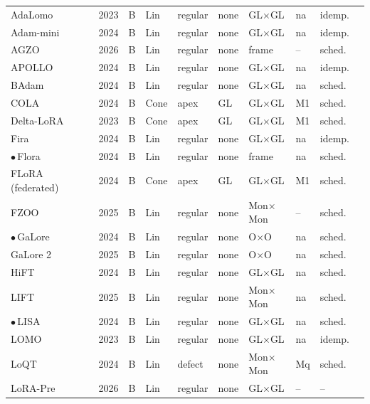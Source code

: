 \begin{longtable}{@{}>{\raggedright\arraybackslash}p{2.53cm}>{\raggedright\arraybackslash}p{3.2cm}r l l l l l l l l@{}}
AdaLomo & \citealp{lv2023adalomo} & 2023 & B & Lin & regular & none & GL$\times$GL & na & idemp. & \\
Adam-mini & \citealp{zhang2024adam} & 2024 & B & Lin & regular & none & GL$\times$GL & na & idemp. & \\
AGZO & \citealp{lin2026agzo} & 2026 & B & Lin & regular & none & frame & -- & sched. & \\
APOLLO & \citealp{zhu2024apollo} & 2024 & B & Lin & regular & none & GL$\times$GL & na & idemp. & \\
BAdam & \citealp{luo2024badam} & 2024 & B & Lin & regular & none & GL$\times$GL & na & sched. & \\
COLA & \citealp{xia2024chain} & 2024 & B & Cone & apex & GL & GL$\times$GL & M1 & sched. & \\
Delta-LoRA & \citealp{zi2023delta} & 2023 & B & Cone & apex & GL & GL$\times$GL & M1 & sched. & \\
Fira & \citealp{chen2024fira} & 2024 & B & Lin & regular & none & GL$\times$GL & na & idemp. & \\
$\bullet$\,Flora & \citealp{hao2024flora} & 2024 & B & Lin & regular & none & frame & na & sched. & \\
FLoRA (federated) & \citealp{wang2024flora} & 2024 & B & Cone & apex & GL & GL$\times$GL & M1 & sched. & \\
FZOO & \citealp{dang2025fzoo} & 2025 & B & Lin & regular & none & Mon$\times$Mon & -- & sched. & \\
$\bullet$\,GaLore & \citealp{zhao2024galore} & 2024 & B & Lin & regular & none & O$\times$O & na & sched. & \\
GaLore 2 & \citealp{su2025galore} & 2025 & B & Lin & regular & none & O$\times$O & na & sched. & \\
HiFT & \citealp{liu2024hift} & 2024 & B & Lin & regular & none & GL$\times$GL & na & sched. & \\
LIFT & \citealp{liu2025lift} & 2025 & B & Lin & regular & none & Mon$\times$Mon & na & sched. & \\
$\bullet$\,LISA & \citealp{pan2024lisa} & 2024 & B & Lin & regular & none & GL$\times$GL & na & sched. & \\
LOMO & \citealp{lv2023full} & 2023 & B & Lin & regular & none & GL$\times$GL & na & idemp. & \\
LoQT & \citealp{loeschcke2024loqt} & 2024 & B & Lin & defect & none & Mon$\times$Mon & Mq & sched. & \\
LoRA-Pre & \citealp{wang2026taming} & 2026 & B & Lin & regular & none & GL$\times$GL & -- & -- & \\

\end{longtable}
